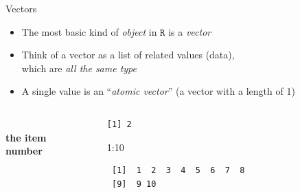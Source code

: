 \documentclass[
  ignorenonframetext,
]{beamer}
\newenvironment{Shaded}{\begin{snugshade}}{\end{snugshade}}
\newcommand{\AlertTok}[1]{\textcolor[rgb]{0.94,0.16,0.16}{#1}}
\newcommand{\DecValTok}[1]{\textcolor[rgb]{0.00,0.00,0.81}{#1}}
\newcommand{\SpecialCharTok}[1]{\textcolor[rgb]{0.00,0.00,0.00}{#1}}
\begin{document}
\begin{frame}[fragile]{Vectors}
\protect\hypertarget{vectors}{}
\begin{itemize}
\item
  The most basic kind of \emph{object} in \(\texttt{R}\) is a
  \emph{vector}
\item
  Think of a vector as a list of related values (data),\\
  which are \emph{all the same type}
\item
  A single value is an ``\emph{atomic vector}'' (a vector with a length
  of 1)
\end{itemize}

\hfill\break

\begin{columns}[c]
\begin{column}{0.25\textwidth}
\centering
\AlertTok{\Large\textbf{\\ the item\\ number}}
\end{column}

\begin{column}{0.5\textwidth}
\begin{verbatim}
[1] 2
\end{verbatim}

\begin{Shaded}
\begin{Highlighting}[]
\DecValTok{1}\SpecialCharTok{:}\DecValTok{10}
\end{Highlighting}
\end{Shaded}

\begin{verbatim}
 [1]  1  2  3  4  5  6  7  8
 [9]  9 10
\end{verbatim}
\end{column}

\begin{column}{0.25\textwidth}
\centering
\AlertTok{\Large\textbf{}}
\end{column}
\end{columns}

\end{frame}
\end{document}
